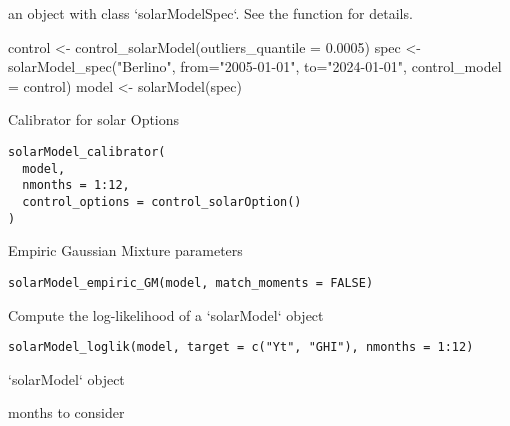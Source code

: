 \documentclass[a4paper]{book}
\begin{document}
%
\begin{Arguments}
\begin{ldescription}
\item[\code{spec}] an object with class `solarModelSpec`. See the function  for details.
\end{ldescription}
\end{Arguments}
%
\begin{Examples}
\begin{ExampleCode}
control <- control_solarModel(outliers_quantile = 0.0005)
spec <- solarModel_spec("Berlino", from="2005-01-01", to="2024-01-01", control_model = control)
model <- solarModel(spec)
\end{ExampleCode}
\end{Examples}
%
\begin{Description}\relax
Calibrator for solar Options
\end{Description}
%
\begin{Usage}
\begin{verbatim}
solarModel_calibrator(
  model,
  nmonths = 1:12,
  control_options = control_solarOption()
)
\end{verbatim}
\end{Usage}
%
\begin{Description}\relax
Empiric Gaussian Mixture parameters
\end{Description}
%
\begin{Usage}
\begin{verbatim}
solarModel_empiric_GM(model, match_moments = FALSE)
\end{verbatim}
\end{Usage}
%
\begin{Description}\relax
Compute the log-likelihood of a `solarModel` object
\end{Description}
%
\begin{Usage}
\begin{verbatim}
solarModel_loglik(model, target = c("Yt", "GHI"), nmonths = 1:12)
\end{verbatim}
\end{Usage}
%
\begin{Arguments}
\begin{ldescription}
\item[\code{model}] `solarModel` object

\item[\code{nmonths}] months to consider
\end{ldescription}
\end{Arguments}
\end{document}
